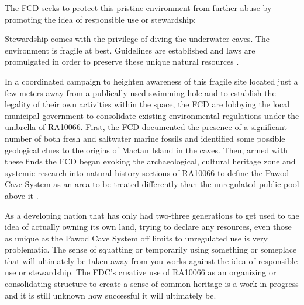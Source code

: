 \documentclass[english]{ijsra}
\begin{document}
The FCD seeks to protect this pristine environment from further abuse by promoting the idea of responsible use or stewardship:

\begin{displayquote}
	Stewardship comes with the privilege of diving the underwater caves. The environment is fragile at best. Guidelines are established and laws are promulgated in order to preserve these unique natural resources \parencite{Divers_2014b}.
\end{displayquote}

In a coordinated campaign to heighten awareness of this fragile site located just a few meters away from a publically used swimming hole and to establish the legality of their own activities within the space, the FCD are lobbying the local municipal government to consolidate existing environmental regulations under the umbrella of RA10066. First, the FCD documented the presence of a significant number of both fresh and saltwater marine fossils and identified some possible geological clues to the origins of Mactan Island in the caves. Then,  armed with these finds the FCD began evoking the archaeological, cultural heritage zone and systemic research into natural history sections of RA10066 to define the Pawod Cave System as an area to be treated differently than the unregulated public pool above it \parencite{Divers_2014b}.

As a developing nation that has only had two-three generations to get used to the idea of actually owning its own land, trying to declare any resources, even those as unique as the Pawod Cave System off limits to unregulated use is very problematic. The sense of squatting or temporarily using something or someplace that will ultimately be taken away from you works against the idea of responsible use or stewardship. The FDC’s creative use of RA10066 as an organizing or consolidating structure to create a sense of common heritage is a work in progress and it is still unknown how successful it will ultimately be.

\end{document}
